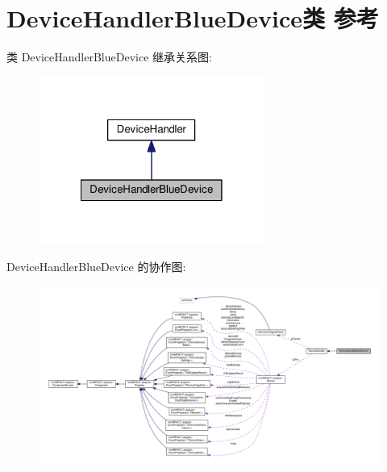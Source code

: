 \hypertarget{class_device_handler_blue_device}{\section{Device\+Handler\+Blue\+Device类 参考}
\label{class_device_handler_blue_device}
}


类 Device\+Handler\+Blue\+Device 继承关系图\+:
\nopagebreak
\begin{figure}[H]
\begin{center}
\leavevmode
\includegraphics[width=210pt]{class_device_handler_blue_device__inherit__graph}
\end{center}
\end{figure}


Device\+Handler\+Blue\+Device 的协作图\+:
\nopagebreak
\begin{figure}[H]
\begin{center}
\leavevmode
\includegraphics[width=350pt]{class_device_handler_blue_device__coll__graph}
\end{center}
\end{figure}
